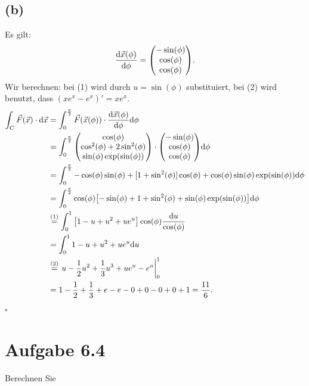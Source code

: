 \documentclass{theozettel}
\begin{document}
\subsection*{(b)} 
Es gilt:
	\[
		\dv{\vec{x}(\phi)}{\phi} = \mqty(-\sin(\phi) \\ \cos(\phi) \\ \cos(\phi) ).
	\]
Wir berechnen: bei (1) wird durch $u = \sin(\phi)$ substituiert, bei (2) wird benutzt, dass $(xe^{x}-e^{x})' = xe^{x}$. 
	\begin{align*}
		\int_{C} \vec{F}(\vec{x}) \cdot \dd \vec{x} &= \int_{0}^{\frac{\pi}{2}} \vec{F}(\vec{x}(\phi)) \cdot \dv{\vec{x}(\phi)}{\phi} \dd \phi \\
		&= \int_{0}^{\frac{\pi}{2}} \mqty(\cos(\phi) \\  \cos^{2}(\phi) + 2\sin^{2}(\phi) \\ \sin(\phi)\exp(\sin(\phi)) ) \cdot \mqty(-\sin(\phi) \\ \cos(\phi) \\ \cos(\phi) ) \dd \phi \\
		&= \int_{0}^{\frac{\pi}{2}} -\cos(\phi)\sin(\phi) + [1 + \sin^{2}(\phi)]\cos(\phi) + \cos(\phi)\sin(\phi)\exp(\sin(\phi)) \dd \phi \\
		&= \int_{0}^{\frac{\pi}{2}} \cos(\phi)\qty[-\sin(\phi) + 1 + \sin^{2}(\phi) + \sin(\phi)\exp(\sin(\phi))] \dd \phi \\
		&\stackrel{\text{(1)}}{=} \int_{0}^{1} \qty[1 - u +u^{2} + ue^{u}] \cos(\phi) \frac{\dd u}{\cos(\phi)} \\
		&= \int_{0}^{1} 1-u+u^{2}+ue^{u} \dd u \\
		&\stackrel{\text{(2)}}{=} \eval{u - \frac{1}{2}u^{2} + \frac{1}{3}u^{3} + ue^{u} - e^{u}}_{0}^{1} \\
		&= 1 - \frac{1}{2} + \frac{1}{3} + e - e - 0 + 0 - 0 + 0 + 1  = \frac{11}{6}.
	\end{align*} \hfill $\square$




\newpage
\section*{Aufgabe 6.4} 
Berechnen Sie
\end{document}
